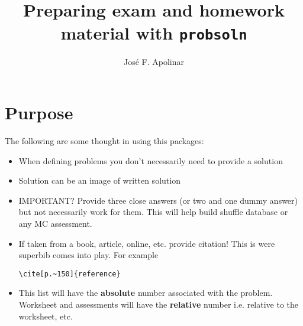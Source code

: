 \documentclass[12pt]{scrartcl}
\newenvironment{myenum}{
\begin{enumerate}[leftmargin=*]
  \setlength{\itemsep}{0.5em}
  \setlength{\parskip}{0pt}
  \setlength{\parsep}{0pt}
}{\end{enumerate}}
\begin{document}
\author{José F. Apolinar}
\title{Preparing exam and homework material with \texttt{probsoln}}
\maketitle

\section*{Purpose}
The following are some thought in using this packages:
\begin{itemize}
  \item When defining problems you don't necessarily need to provide a solution
  \item Solution can be an image of written solution
  \item IMPORTANT? Provide three close answers (or two and one dummy answer) but not necessarily work for them. This will help build shuffle database or any MC assessment.
  \item If taken from a book, article, online, etc. provide citation! This is were superbib comes into play. For example \begin{verbatim}\cite[p.~150]{reference}\end{verbatim}
  \item This list will have the \textbf{absolute} number associated with the problem. Worksheet and assessments will have the \textbf{relative} number i.e. relative to the worksheet, etc.
\end{itemize}





\end{document}
